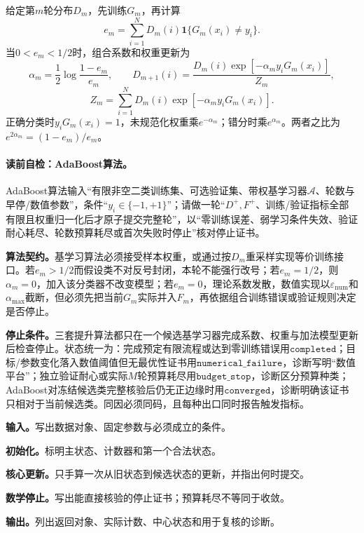 给定第$m$轮分布$D_m$，先训练$G_m$，再计算
\[
e_m=\sum_{i=1}^{N}D_m(i)\mathbf{1}\{G_m(x_i)\neq y_i\}.
\]
当$0<e_m<1/2$时，组合系数和权重更新为
\[
\alpha_m=\frac12\log\frac{1-e_m}{e_m},\qquad
D_{m+1}(i)=\frac{D_m(i)\exp[-\alpha_my_iG_m(x_i)]}{Z_m},
\]
\[
Z_m=\sum_{i=1}^{N}D_m(i)\exp[-\alpha_my_iG_m(x_i)].
\]
正确分类时$y_iG_m(x_i)=1$，未规范化权重乘$e^{-\alpha_m}$；错分时乘$e^{\alpha_m}$。两者之比为$e^{2\alpha_m}=(1-e_m)/e_m$。

\paragraph{读前自检：AdaBoost算法。}AdaBoost算法输入“有限非空二类训练集、可选验证集、带权基学习器$\mathcal A$、轮数与早停/数值参数”，条件“$y_i\in\{-1,+1\}$”；请做一轮“$D^+,F^+$、训练/验证指标全部有限且权重归一化后才原子提交完整轮”，以“零训练误差、弱学习条件失效、验证耐心耗尽、轮数预算耗尽或首次失败时停止”核对停止证书。\par

\label{struct:V3-C03-CH10}
\label{struct:V3-C03-CH11}
\textbf{算法契约。}基学习算法必须接受样本权重，或通过按$D_m$重采样实现等价训练接口。若$e_m>1/2$而假设类不对反号封闭，本轮不能强行改号；若$e_m=1/2$，则$\alpha_m=0$，加入该分类器不改变模型；若$e_m=0$，理论系数发散，数值实现以$\varepsilon_{\mathrm{num}}$和$\alpha_{\max}$截断，但必须先把当前$G_m$实际并入$F_m$，再依据组合训练错误或验证规则决定是否停止。

\textbf{停止条件。}三套提升算法都只在一个候选基学习器完成系数、权重与加法模型更新后检查停止。状态统一为：完成预定有限流程或达到零训练错误用$\mathtt{completed}$；目标/参数变化落入数值阈值但无最优性证书用$\mathtt{numerical\_failure}$，诊断写明“数值平台”；独立验证耐心或实际$M$轮预算耗尽用$\mathtt{budget\_stop}$，诊断区分预算种类；AdaBoost对冻结候选类完整核验后仍无正边缘时用$\mathtt{converged}$，诊断明确该证书只相对于当前候选类。同因必须同码，且每种出口同时报告触发指标。


\begin{keypointbox}[title={二类AdaBoost训练：五步阅读}]
\textbf{输入。}写出数据对象、固定参数与必须成立的条件。\par
\textbf{初始化。}标明主状态、计数器和第一个合法状态。\par
\textbf{核心更新。}只手算一次从旧状态到候选状态的更新，并指出何时提交。\par
\textbf{数学停止。}写出能直接核验的停止证书；预算耗尽不等同于收敛。\par
\textbf{输出。}列出返回对象、实际计数、中心状态和用于复核的诊断。
\end{keypointbox}

